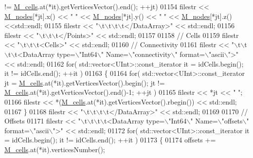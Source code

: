 \begin{DoxyCode}
      != \hyperlink{classFVCode3D_1_1Mesh3D_a8cac877e809226fb96078183efb25a2f}{M\_cells}.at(*it).getVerticesVector().end(); ++jt)
01154             filestr << \hyperlink{classFVCode3D_1_1Mesh3D_a5464981fd097ce785675d91522884739}{M\_nodes}[*jt].x() << \textcolor{stringliteral}{" "} << \hyperlink{classFVCode3D_1_1Mesh3D_a5464981fd097ce785675d91522884739}{M\_nodes}[*jt].y() << \textcolor{stringliteral}{" "} << 
      \hyperlink{classFVCode3D_1_1Mesh3D_a5464981fd097ce785675d91522884739}{M\_nodes}[*jt].z() <<std::endl;
01155     filestr << \textcolor{stringliteral}{"\(\backslash\)t\(\backslash\)t\(\backslash\)t\(\backslash\)t</DataArray>"} << std::endl;
01156     filestr << \textcolor{stringliteral}{"\(\backslash\)t\(\backslash\)t\(\backslash\)t</Points>"} << std::endl;
01157 
01158     \textcolor{comment}{// Cells}
01159     filestr << \textcolor{stringliteral}{"\(\backslash\)t\(\backslash\)t\(\backslash\)t<Cells>"} << std::endl;
01160     \textcolor{comment}{//  Connectivity}
01161     filestr << \textcolor{stringliteral}{"\(\backslash\)t\(\backslash\)t\(\backslash\)t\(\backslash\)t<DataArray type=\(\backslash\)"Int64\(\backslash\)" Name=\(\backslash\)"connectivity\(\backslash\)" format=\(\backslash\)"ascii\(\backslash\)">"} << std::endl;
01162     \textcolor{keywordflow}{for}( std::vector<UInt>::const\_iterator it = idCells.begin(); it != idCells.end(); ++it )
01163     \{
01164         \textcolor{keywordflow}{for}( std::vector<UInt>::const\_iterator jt = \hyperlink{classFVCode3D_1_1Mesh3D_a8cac877e809226fb96078183efb25a2f}{M\_cells}.at(*it).getVerticesVector().begin(); jt 
      != \hyperlink{classFVCode3D_1_1Mesh3D_a8cac877e809226fb96078183efb25a2f}{M\_cells}.at(*it).getVerticesVector().end()-1; ++jt )
01165             filestr << *jt << \textcolor{stringliteral}{" "};
01166         filestr << *(\hyperlink{classFVCode3D_1_1Mesh3D_a8cac877e809226fb96078183efb25a2f}{M\_cells}.at(*it).getVerticesVector().rbegin()) << std::endl;
01167     \}
01168     filestr << \textcolor{stringliteral}{"\(\backslash\)t\(\backslash\)t\(\backslash\)t\(\backslash\)t</DataArray>"} << std::endl;
01169 
01170     \textcolor{comment}{//  Offsets}
01171     filestr << \textcolor{stringliteral}{"\(\backslash\)t\(\backslash\)t\(\backslash\)t\(\backslash\)t<DataArray type=\(\backslash\)"Int64\(\backslash\)" Name=\(\backslash\)"offsets\(\backslash\)" format=\(\backslash\)"ascii\(\backslash\)">"} << std::endl;
01172     \textcolor{keywordflow}{for}( std::vector<UInt>::const\_iterator it = idCells.begin(); it != idCells.end(); ++it )
01173     \{
01174         offsets += \hyperlink{classFVCode3D_1_1Mesh3D_a8cac877e809226fb96078183efb25a2f}{M\_cells}.at(*it).verticesNumber();

\end{DoxyCode}
